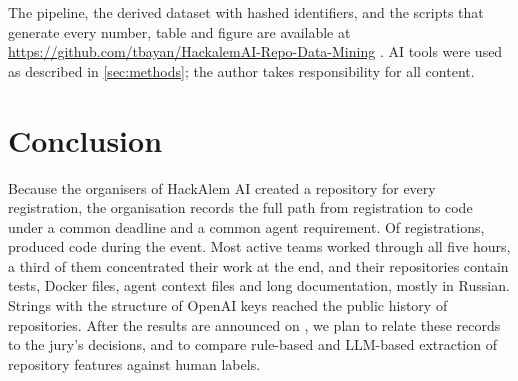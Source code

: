 \documentclass{article}
\begin{document}
The pipeline, the derived dataset with hashed identifiers, and the scripts that generate every number, table and figure are available at \url{https://github.com/tbayan/HackalemAI-Repo-Data-Mining} . AI tools were used as described in \cref{sec:methods}; the author takes responsibility for all content.

\section{Conclusion}\label{sec:conclusion}

Because the organisers of HackAlem AI created a repository for every registration, the organisation records the full path from registration to code under a common deadline and a common agent requirement. Of \NReposTotal{} registrations, \NReposActive{} produced code during the event. Most active teams worked through all five hours, a third of them concentrated their work at the end, and their repositories contain tests, Docker files, agent context files and long documentation, mostly in Russian. Strings with the structure of OpenAI keys reached the public history of \NReposOpenaiKeyN{} repositories. After the results are announced on \awardsdate{}, we plan to relate these records to the jury's decisions, and to compare rule-based and LLM-based extraction of repository features against human labels.



\end{document}
